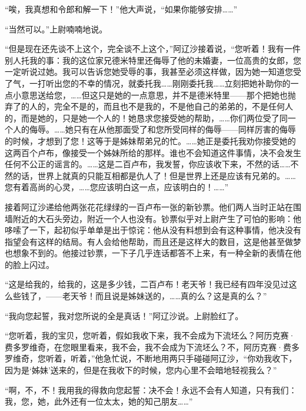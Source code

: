 \par “唉，我真想和令郎和解一下！”他大声说，“如果你能够安排……”
\par “当然可以。”上尉喃喃地说。
\par “但是现在还先谈不上这个，完全谈不上这个，”阿辽沙接着说，“您听着！我有一件别人托我的事：我的这位家兄德米特里还侮辱了他的未婚妻，一位高贵的女郎，您一定听说过她。我可以告诉您她受辱的事，我甚至必须这样做，因为她一知道您受了气，一打听出您的不幸的情况，就委托我……刚刚委托我……立刻把她补助你的一点小意思送给您，……但这只是她的一点意思，并不是德米特里——那个把她也抛弃了的人的，完全不是的，而且也不是我的，不是他自己的弟弟的，不是任何人的，而是她的，只是她一个人的！她恳求您接受她的帮助，……你们两位受了同一个人的侮辱。……她只有在从他那面受了和您所受同样的侮辱——同样厉害的侮辱的时候，才想到了您！这等于是姊妹帮弟兄的忙。……她正是委托我劝你接受她的这两百个卢布，像接受一个姊妹所给的那样。谁也不会知道这件事情，决不会发生任何不公正的谣言的。……这是二百卢布，我发誓，你应该收下来，不然的话……不然的话，世界上就真的只能互相都是仇人了！但是世界上还是应该有兄弟的。……您有着高尚的心灵，……您应该明白这一点，应该明白的！……”
\par 接着阿辽沙递给他两张花花绿绿的一百卢布一张的新钞票。他们两人当时正站在围墙附近的大石头旁边，附近一个人也没有。钞票似乎对上尉产生了可怕的影响：他哆嗦了一下，起初似乎单单是出于惊诧：他从没有料想到会有这种事情，他决没有指望会有这样的结局。有人会给他帮助，而且还是这样大的数目，这是他甚至做梦也想象不到的。他接过钞票，一下子几乎连话都答不上来，有一种全新的表情在他的脸上闪过。
\par “这是给我的，给我的，这是多少钱，二百卢布！老天爷！我已经有四年没见过这么些钱了，——老天爷！而且说是姊妹送的，……真的么？这是真的么？”
\par “我向您起誓，我对您所说的全是真话！”阿辽沙说。上尉脸红了。
\par “您听着，我的宝贝，您听着，假如我收下来，我不会成为下流坯么？阿历克赛·费多罗维奇，在您眼里看来，我不会，我不会成为下流坯么？不，阿历克赛·费多罗维奇，您听着，听着，”他急忙说，不断地用两只手碰碰阿辽沙，“你劝我收下，因为是‘姊妹’送来的，但是在我收下的时候，您内心里不会暗地轻视我么？”
\par “啊，不，不！我用我的得救向您起誓：决不会！永远不会有人知道，只有我们：我，您，她，此外还有一位太太，她的知己朋友……”
